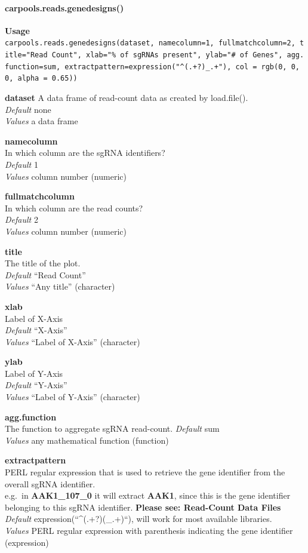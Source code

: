 \documentclass[]{article}
\let\oldparagraph\paragraph
\renewcommand{\paragraph}[1]{\oldparagraph{#1}\mbox{}}
\begin{document}
\paragraph{carpools.reads.genedesigns()}\label{carpools.reads.genedesigns}

\textbf{Usage}\\
\texttt{carpools.reads.genedesigns(dataset,\ namecolumn=1,\ fullmatchcolumn=2,\ title="Read\ Count",\ xlab="\%\ of\ sgRNAs\ present",\ ylab="\#\ of\ Genes",\ agg.function=sum,\ extractpattern=expression("\^{}(.+?)\_.+"),\ col\ =\ rgb(0,\ 0,\ 0,\ alpha\ =\ 0.65))}

\textbf{dataset} A data frame of read-count data as created by
load.file().\\
\emph{Default} none\\
\emph{Values} a data frame

\textbf{namecolumn}\\
In which column are the sgRNA identifiers?\\
\emph{Default} 1\\
\emph{Values} column number (numeric)

\textbf{fullmatchcolumn}\\
In which column are the read counts?\\
\emph{Default} 2\\
\emph{Values} column number (numeric)

\textbf{title}\\
The title of the plot.\\
\emph{Default} ``Read Count''\\
\emph{Values} ``Any title'' (character)

\textbf{xlab}\\
Label of X-Axis\\
\emph{Default} ``X-Axis''\\
\emph{Values} ``Label of X-Axis'' (character)

\textbf{ylab}\\
Label of Y-Axis\\
\emph{Default} ``Y-Axis''\\
\emph{Values} ``Label of Y-Axis'' (character)

\textbf{agg.function}\\
The function to aggregate sgRNA read-count. \emph{Default} sum\\
\emph{Values} any mathematical function (function)

\textbf{extractpattern}\\
PERL regular expression that is used to retrieve the gene identifier
from the overall sgRNA identifier.\\
e.g.~in \textbf{AAK1\_107\_0} it will extract \textbf{AAK1}, since this
is the gene identifier belonging to this sgRNA identifier.
\textbf{Please see: Read-Count Data Files}\\
\emph{Default} expression(``\^{}(.+?)(\_.+)``), will work for most
available libraries.\\
\emph{Values} PERL regular expression with parenthesis indicating the
gene identifier (expression)
\end{document}

